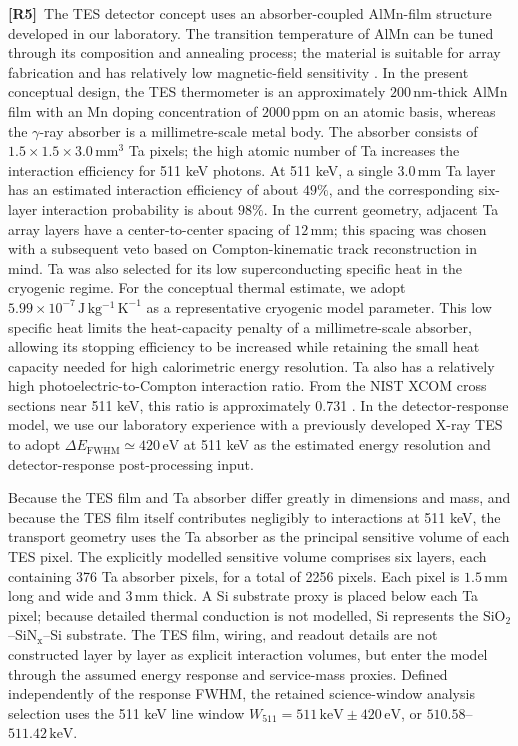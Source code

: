 \documentclass[11pt]{article}
\newcommand{\revmark}[1]{\textcolor{revisionblue}{\textbf{[R#1]}}\ }
\begin{document}
\revmark{5}The TES detector concept uses an absorber-coupled AlMn-film structure developed
in our laboratory. The transition temperature of AlMn can be tuned through its
composition and annealing process; the material is suitable for array fabrication
and has relatively low magnetic-field sensitivity
\cite{Xie2026AlMn,Vavagiakis2017AlMnMagnetic}. In the present conceptual design,
the TES thermometer is an approximately $200\,\mathrm{nm}$-thick AlMn film with
an Mn doping concentration of $2000\,\mathrm{ppm}$ on an atomic basis, whereas the $\gamma$-ray absorber is a
millimetre-scale metal body. The absorber consists of
$1.5\times1.5\times3.0\,\mathrm{mm^3}$ Ta pixels; the high atomic number of Ta
increases the interaction efficiency for 511 keV photons. At 511 keV, a single
$3.0\,\mathrm{mm}$ Ta layer has an estimated interaction efficiency of about
$49\%$, and the corresponding six-layer interaction probability is about
$98\%$. In the
current geometry, adjacent Ta array layers have a center-to-center spacing of
$12\,\mathrm{mm}$; this spacing was chosen with a subsequent veto based on
Compton-kinematic track reconstruction in mind. Ta was also selected for its low
superconducting specific heat in the cryogenic regime. For the conceptual
thermal estimate, we adopt
$5.99\times10^{-7}\,\mathrm{J\,kg^{-1}\,K^{-1}}$ as a representative
cryogenic model parameter. This low specific heat limits
the heat-capacity penalty of a millimetre-scale absorber, allowing its stopping
efficiency to be increased while retaining the small heat capacity needed for
high calorimetric energy resolution. Ta also has a relatively
high photoelectric-to-Compton interaction ratio. From
the NIST XCOM cross sections near 511 keV, this ratio is approximately 0.731
\cite{NISTXCOM}. In the detector-response model, we use our laboratory experience
with a previously developed X-ray TES \cite{Xie2026AlMn} to adopt
$\Delta E_{\mathrm{FWHM}}\simeq420\,\mathrm{eV}$ at 511 keV as the estimated
energy resolution and detector-response post-processing input.

Because the TES film and Ta absorber differ greatly in dimensions and mass, and
because the TES film itself contributes negligibly to interactions at 511 keV,
the transport geometry uses the Ta absorber as the principal sensitive volume of
each TES pixel. The explicitly modelled sensitive volume comprises six layers,
each containing 376 Ta absorber pixels, for a total of 2256 pixels. Each pixel is
$1.5\,\mathrm{mm}$ long and wide and $3\,\mathrm{mm}$ thick. A Si substrate proxy
is placed below each Ta pixel; because detailed thermal conduction is not modelled,
Si represents the $\mathrm{SiO_2}$--$\mathrm{SiN_x}$--Si substrate. The TES film,
wiring, and readout details are not constructed layer by layer as explicit
interaction volumes, but enter the model through the assumed energy response and
service-mass proxies. Defined independently of the response FWHM, the retained science-window
analysis selection uses the 511 keV line window
$W_{511}=511\,\mathrm{keV}\pm420\,\mathrm{eV}$, or
$510.58$--$511.42\,\mathrm{keV}$.
\end{document}
